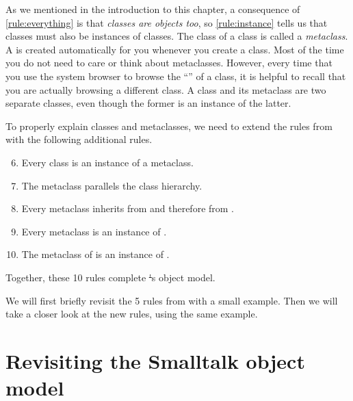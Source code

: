 \documentclass[a4paper,10pt,twoside]{book}
\begin{document}
As we mentioned in the introduction to this chapter, a consequence of \ref{rule:everything} is that \emph{classes are objects too}, so \ref{rule:instance} tells us that classes must also be instances of classes.
The class of a class is called a \emph{metaclass}.
\label{sec:metaclassIntro}
A  is created automatically for you whenever you create a class.
Most of the time you do not need to care or think about metaclasses.
However, every time that you use the system browser to browse the ``'' of a class, it is helpful to recall that you are actually browsing a different class.
A class and its metaclass are two separate classes, even though the former is an instance of the latter.

To properly explain classes and metaclasses, we need to extend the rules from  with the following additional rules.

\begin{enumerate}[label={\textbf{Rule \arabic{*}}.}, ref={Rule \arabic{*}}, leftmargin=*, widest=10]
\setcounter{enumi}{5}
\item{} \label{rule:metaclass}
	Every class is an instance of a metaclass.

\item{} \label{rule:parallelhierarchy}
	The metaclass  parallels the class hierarchy.

\item{} \label{rule:behavior}
	Every metaclass inherits from  and therefore from .

\item{} \label{rule:metaclassclass}
	Every metaclass is an instance of .

\item{} \label{rule:metaclassmetaclass}
	The metaclass of  is an instance of .

\end{enumerate}

\noindent
Together, these 10 rules complete \st's object model.

We will first briefly revisit the 5 rules from  with a small example.
Then we will take a closer look at the new rules, using the same example.

\section{Revisiting the Smalltalk object model}
\end{document}
